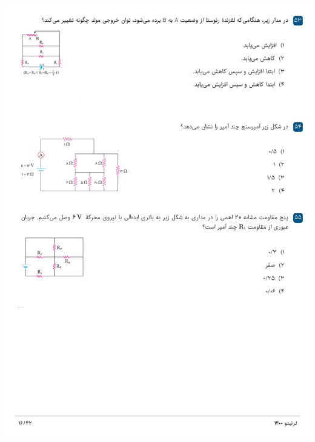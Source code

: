 \documentclass{book}
\begin{document}
\includegraphics[width=\textwidth]{"pages/16"}
\end{document}

